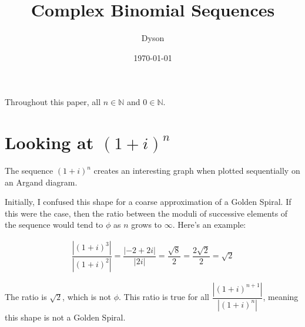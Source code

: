 \documentclass[a4paper]{article}
\title{Complex Binomial Sequences}
\author{Dyson}
\date{\today}
\newcommand{\abs}[1]{\left| #1 \right|}
\newcommand{\opi}{(1 + i)}
\begin{document}
\maketitle

\setlength{\parindent}{0em}
\setlength{\parskip}{1em}

Throughout this paper, all $n \in \mathbb{N}$ and $0 \in \mathbb{N}$.

\section{Looking at $\opi^n$}

The sequence $\opi^n$ creates an interesting graph when plotted sequentially on an Argand diagram.

\begin{center}
\end{center}

Initially, I confused this shape for a coarse approximation of a Golden Spiral. If this were the case, then the ratio between the moduli of successive elements of the sequence would tend to $\phi$ as $n$ grows to $\infty$. Here's an example:

\begin{align*}
\dfrac{\abs{\opi^3}}{\abs{\opi^2}} = \dfrac{\abs{-2 + 2i}}{\abs{2i}} = \dfrac{\sqrt{8}}{2} = \dfrac{2\sqrt{2}}{2} = \sqrt{2}
\end{align*}

The ratio is $\sqrt{2}$, which is not $\phi$. This ratio is true for all $\dfrac{\abs{\opi^{n + 1}}}{\abs{\opi^n}}$, meaning this shape is not a Golden Spiral.
\end{document}
